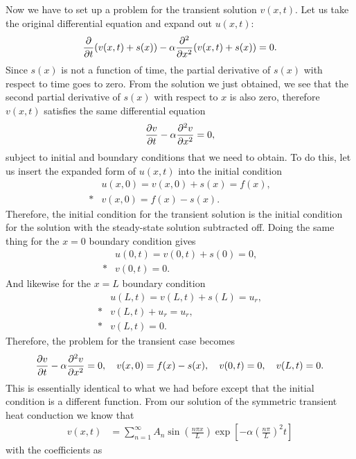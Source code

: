 Now we have to set up a problem for the transient solution $v(x,t)$. Let us take the original differential equation and expand out $u(x,t)$:
\begin{align}
  \frac{ \partial {} }{ \partial {t} } ( v(x,t) + s(x) ) - \alpha \frac{ \partial^2 {} }{ \partial {x}^2 } ( v(x,t) + s(x) ) = 0.
\end{align}
Since $s(x)$ is not a function of time, the partial derivative of $s(x)$ with respect to time goes to zero. From the solution we just obtained, we see that the second partial derivative of $s(x)$ with respect to $x$ is also zero, therefore $v(x,t)$ satisfies the same differential equation
\begin{align}
  \frac{ \partial {v} }{ \partial {t} } - \alpha \frac{ \partial^2 {v} }{ \partial {x}^2 } = 0 ,
\end{align}
subject to initial and boundary conditions that we need to obtain. To do this, let us insert the expanded form of $u(x,t)$ into the initial condition
\begin{align}
  &u(x,0) = v(x,0) + s(x) = f(x), \nonumber  \\*
  &v(x,0) = f(x) - s(x) .
\end{align}
Therefore, the initial condition for the transient solution is the initial condition for the solution with the steady-state solution subtracted off. Doing the same thing for the $x = 0$ boundary condition gives
\begin{align}
  &u(0,t) = v(0,t) + s(0) = 0, \nonumber \\*
  &v(0,t) = 0 .
\end{align}
And likewise for the $x = L$ boundary condition
\begin{align}
  &u(L,t) = v(L,t) + s(L) = u_r, \nonumber \\* 
  &v(L,t) + u_r = u_r, \nonumber \\* 
  &v(L,t) = 0 .
\end{align}
Therefore, the problem for the transient case becomes
\begin{align}
  \frac{ \partial {v} }{ \partial {t} } - \alpha \frac{ \partial^2 {v} }{ \partial {x}^2 } = 0, \quad v(x,0) = f(x) - s(x), \quad v(0,t) = 0, \quad v(L,t) = 0 .
\end{align}
This is essentially identical to what we had before except that the initial condition is a different function. From our solution of the symmetric transient heat conduction we know that
\begin{align}
  v(x,t) &= \sum_{n=1}^\infty A_n \sin \left( \frac{ n \pi x }{ L } \right)  \exp \left[ -\alpha \left( \frac{ n \pi }{ L } \right)^2 t \right] 
\end{align}
with the coefficients as
